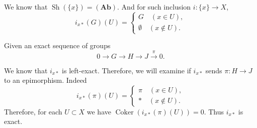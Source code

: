 \documentclass{article}
\DeclareMathOperator{\Coker}{Coker}
\DeclareMathOperator{\Sh}{Sh}
\begin{document}
We know that $\Sh(\{x\})=(\mathbf{Ab})$. And for such inclusion $i:\{x\}\to X$, 
\begin{equation*}
i_{x*}(G)(U) = 
\begin{cases}
G\quad (x\in U),\\
\emptyset \quad(x\not\in U).
\end{cases}
\end{equation*}

Given an exact sequence of groups
\begin{equation*}
0\to G\to H\to J\overset{\pi}{\to} 0.
\end{equation*}

We know that $i_{x*}$ is left-exact. Therefore, we will examine if $i_{x*}$ sends $\pi:H\to J$ to an epimorphism. Indeed
\begin{equation*}
i_{x*}(\pi)(U) = 
\begin{cases}
\pi \quad(x\in U),\\
*\quad(x\not\in U).
\end{cases}
\end{equation*}
Therefore, for each $U\subset X$ we have $\Coker(i_{x*}(\pi)(U))=0$. Thus $i_{x*}$ is exact.
\end{document}
